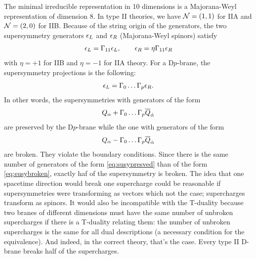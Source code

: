    The minimal irreducible representation in 10 dimensions is a Majorana-Weyl representation of dimension 8. In type II theories, we have $\mathcal{N}=(1,1)$ for IIA and $\mathcal{N}=(2,0)$ for IIB. Because of the string origin of the generators, the two supersymmetry generators $\epsilon_L$ and $\epsilon_R$ (Majorana-Weyl spinors) satisfy
    \begin{equation}
        \epsilon_L=\Gamma_{11}\epsilon_L,\qquad \epsilon_R=\eta\Gamma_{11}\epsilon_R
    \end{equation}
    with $\eta=+1$ for IIB and $\eta=-1$ for IIA theory. For a D$p$-brane, the supersymmetry projections is the following:
    \begin{equation}
        \epsilon_L=\Gamma_0\dots\Gamma_p\epsilon_R.
    \end{equation}
    In other words, the supersymmetries with generators of the form
    \begin{equation}
        Q_\alpha+\Gamma_0\dots\Gamma_p\overline{Q}_{\dot{\alpha}}\label{eq:susypresved}
    \end{equation}
    are preserved by the D$p$-brane while the one with generators of the form
    \begin{equation}
        Q_\alpha-\Gamma_0\dots\Gamma_p\overline{Q}_{\dot{\alpha}}\label{eq:susybroken}
    \end{equation}
    are broken. They violate the boundary conditions. Since there is the same number of generators of the form \eqref{eq:susypresved} than of the form \eqref{eq:susybroken}, exactly haf of the supersymmetry is broken. The idea that one spacetime direction would break one supercharge could be reasonable if supersymmetries were transforming as vectors which not the case; supercharges transform as spinors. It would also be incompatible with the T-duality because two branes of different dimensions must have the same number of unbroken supercharges if there is a T-duality relating them: the number of unbroken supercharges is the same for all dual descriptions (a necessary condition for the equivalence). And indeed, in the correct theory, that's the case. Every type II D-brane breaks half of the supercharges.

